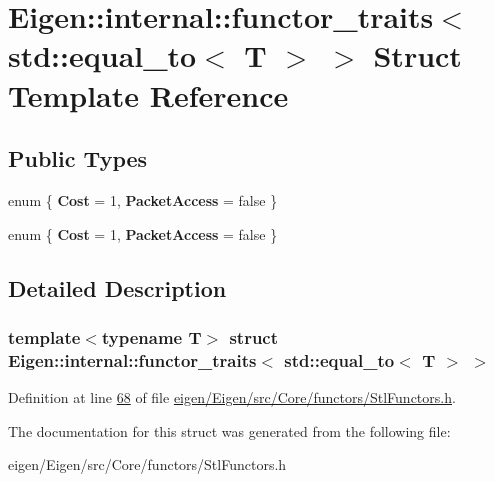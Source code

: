 \hypertarget{struct_eigen_1_1internal_1_1functor__traits_3_01std_1_1equal__to_3_01_t_01_4_01_4}{}\section{Eigen\+:\+:internal\+:\+:functor\+\_\+traits$<$ std\+:\+:equal\+\_\+to$<$ T $>$ $>$ Struct Template Reference}
\label{struct_eigen_1_1internal_1_1functor__traits_3_01std_1_1equal__to_3_01_t_01_4_01_4}
\subsection*{Public Types}
\begin{DoxyCompactItemize}
\item 
\mbox{\label{struct_eigen_1_1internal_1_1functor__traits_3_01std_1_1equal__to_3_01_t_01_4_01_4_ab59c53452a519b78fdbdf90aaa0bb554}} 
enum \{ {\bfseries Cost} = 1, 
{\bfseries Packet\+Access} = false
 \}
\item 
\mbox{\label{struct_eigen_1_1internal_1_1functor__traits_3_01std_1_1equal__to_3_01_t_01_4_01_4_a16f3cc3824a84429dffa3432e2a12c0b}} 
enum \{ {\bfseries Cost} = 1, 
{\bfseries Packet\+Access} = false
 \}
\end{DoxyCompactItemize}


\subsection{Detailed Description}
\subsubsection*{template$<$typename T$>$\newline
struct Eigen\+::internal\+::functor\+\_\+traits$<$ std\+::equal\+\_\+to$<$ T $>$ $>$}



Definition at line \hyperlink{eigen_2_eigen_2src_2_core_2functors_2_stl_functors_8h_source_l00068}{68} of file \hyperlink{eigen_2_eigen_2src_2_core_2functors_2_stl_functors_8h_source}{eigen/\+Eigen/src/\+Core/functors/\+Stl\+Functors.\+h}.



The documentation for this struct was generated from the following file\+:\begin{DoxyCompactItemize}
\item 
eigen/\+Eigen/src/\+Core/functors/\+Stl\+Functors.\+h\end{DoxyCompactItemize}
